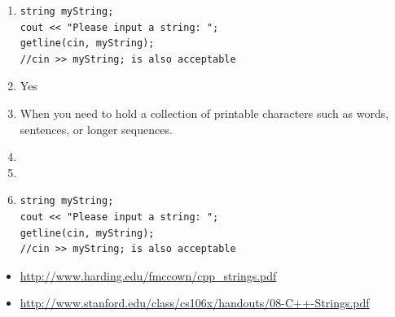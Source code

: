 
\begin{enumerate}
	\item 
\noindent\begin{minipage}{\linewidth}\begin{lstlisting}
string myString;
cout << "Please input a string: ";
getline(cin, myString);
//cin >> myString; is also acceptable
\end{lstlisting}\end{minipage}
	
	\item Yes
	\item When you need to hold a collection of printable characters such as words, sentences, or longer sequences.
	\item {}
	\item {}
	\item
\noindent\begin{minipage}{\linewidth}\begin{lstlisting}
string myString;
cout << "Please input a string: ";
getline(cin, myString);
//cin >> myString; is also acceptable
\end{lstlisting}\end{minipage}
	

\end{enumerate}




\begin{itemize}
\item \url{http://www.harding.edu/fmccown/cpp_strings.pdf}
\item \url{http://www.stanford.edu/class/cs106x/handouts/08-C++-Strings.pdf}
\end{itemize}

